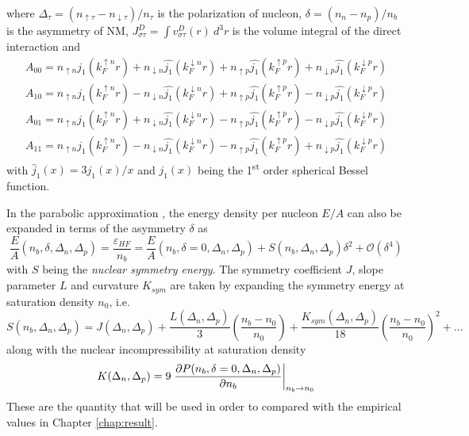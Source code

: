 where $\Delta_{\tau} = (n_{\uparrow \tau} - n_{\downarrow \tau})/n_{\tau}$ is the polarization of nucleon, $\delta = (n_n - n_p)/n_b$ is the asymmetry of \gls{NM}, $J^D_{\sigma\tau} = \int v^D_{\sigma\tau}(r)\: d^3 r$ is the volume integral of the direct interaction and
\begin{equation}
        \begin{array}{l}
                A_{00} = n_{\uparrow n} \hat{j_1}(k_F^{\uparrow n} r) + n_{\downarrow n} \hat{j_1}(k_F^{\downarrow n} r) + n_{\uparrow p} \hat{j_1}(k_F^{\uparrow p} r) + n_{\downarrow p} \hat{j_1}(k_F^{\downarrow p} r)\\[5pt]
                A_{10} = n_{\uparrow n} \hat{j_1}(k_F^{\uparrow n} r) - n_{\downarrow n} \hat{j_1}(k_F^{\downarrow n} r) + n_{\uparrow p} \hat{j_1}(k_F^{\uparrow p} r) - n_{\downarrow p} \hat{j_1}(k_F^{\downarrow p} r)\\[5pt]
                A_{01} = n_{\uparrow n} \hat{j_1}(k_F^{\uparrow n} r) + n_{\downarrow n} \hat{j_1}(k_F^{\downarrow n} r) - n_{\uparrow p} \hat{j_1}(k_F^{\uparrow p} r) - n_{\downarrow p} \hat{j_1}(k_F^{\downarrow p} r)\\[5pt]
                A_{11} = n_{\uparrow n} \hat{j_1}(k_F^{\uparrow n} r) - n_{\downarrow n} \hat{j_1}(k_F^{\downarrow n} r) - n_{\uparrow p} \hat{j_1}(k_F^{\uparrow p} r) + n_{\downarrow p} \hat{j_1}(k_F^{\downarrow p} r)
        \end{array}
\end{equation}
with $\hat{j}_1(x)=3j_1(x)/x$ and $j_1(x)$ being the 1\textsuperscript{st} order spherical Bessel function.\par
In the parabolic approximation \citep{khoa1996study}, the energy density per nucleon $E/A$ can also be expanded in terms of the asymmetry $\delta$ as
\begin{equation}
    \frac{E}{A} (n_b, \delta, \Delta_n, \Delta_p) = \frac{\varepsilon_{HF}}{n_b} = \frac{E}{A} (n_b, \delta=0, \Delta_n, \Delta_p) + S(n_b, \Delta_n, \Delta_p)\delta^2 + \mathcal{O}(\delta^4)
\end{equation}
with $S$ being the \emph{nuclear symmetry energy}. The symmetry coefficient $J$, slope parameter $L$ and curvature $K_{sym}$ are taken by expanding the symmetry energy at saturation density $n_0$, i.e. \citep{tan2020spin,li2008recent,horowitz2014way,lattimer2014symmetry}
\begin{equation}
    S(n_b, \Delta_n, \Delta_p) = J(\Delta_n, \Delta_p) + \frac{L(\Delta_n, \Delta_p)}{3} \left( \frac{n_b - n_0}{n_0} \right) + \frac{K_{sym}(\Delta_n, \Delta_p)}{18} \left( \frac{n_b - n_0}{n_0} \right)^2 + \ldots
\end{equation}
along with the nuclear incompressibility at saturation density
\begin{equation}
    K(\Delta_n, \Delta_p) = 9 \left.\pdv{P(n_b, \delta=0,\Delta_n,\Delta_p)}{n_b}\right|_{n_b \to n_0}
\end{equation}
These are the quantity that will be used in order to compared with the empirical values in Chapter \ref{chap:result}.


